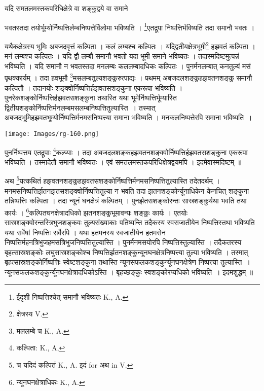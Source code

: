 \documentclass[11pt, openany]{book}
\begin{document}
{\ab यदि समतलमस्तकपरिधिक्षेत्रे वा शङ्कुद्वये वा समाने }

\newpage
\noindent भवतस्तदा तयोर्भूम्योर्निष्पत्तिर्लम्बनिष्पत्तेर्विलोमा भविष्यति । \renewcommand{\thefootnote}{१}\footnote{ईदृशी निष्पत्तिश्चेत् समानौ भविष्यतः {\en K., A.}}एतद्रूपा निष्पत्तिर्भविष्यति तदा समानौ भवतः ।\\
\vspace{5mm}

यथैकक्षेत्रस्य भूमिः अबजदवृत्तं कल्पिता । कलं लम्बश्च कल्पितः । यद्द्वितीयक्षेत्रभूमी\renewcommand{\thefootnote}{२}\footnote{क्षेत्रस्य {\en V.} } हझवतं कल्पिता । मनं लम्बश्च कल्पितः । यदि द्वौ लम्बौ समानौ भवतो यदा भूमी समाने भविष्यतः । तदास्मदिष्टमुत्पन्नं भविष्यति । यदि समानौ न भवतस्तदा मनलम्बः कललम्बादधिकः कल्पितः । पुनर्मनलम्बात् कनतुल्यं मसं पृथक्कार्यम् । तदा हवभूमौ \renewcommand{\thefootnote}{३}\footnote{मललम्बे च {\en K., A.}}मसलम्बतुल्यशङ्कुरुत्पाद्यः । प्रथमम् अबजदलशङ्कुहझवतनशङ्कु समानौ कल्पितौ । तदानयोः शङ्क्वोर्निष्पत्तिर्हझवतसशङ्कुना एकरूपा भविष्यति । पुनरेकशङ्कोर्निष्पत्तिर्हझवतसशङ्कुना तथास्ति यथा भूमेर्निष्पत्तिर्भूम्यास्ति द्वितीयशङ्कोर्निष्पत्तिर्मनलम्बमसलम्बनिष्पत्तितुल्यास्ति~। तस्मात्
अबजदभूमिहझवतभूम्योर्निष्पत्तिर्मनमसनिष्पत्त्या समाना भविष्यति । मनकलनिष्पत्तेरपि समाना भविष्यति~। 
\begin{center}
\texttt{[image: Images/rg-160.png]}  
\end{center}
\vspace{5mm}

 पुनर्निष्पत्तय एतद्रूपाः \renewcommand{\thefootnote}{४}\footnote{कल्पिता: {\en K., A,}}कल्प्याः । तदा अबजदलशङ्कहझवतनशङ्क्वोर्निष्पत्तिर्हझवतसशङ्कुना एकरूपा भविष्यति । तस्मादेतौ समानौ भविष्यतः । एवं समतलमस्तकपरिधिक्षेत्रद्वयमपि । इदमेवास्मदिष्टम् ॥ 

\newpage

अथ \renewcommand{\thefootnote}{१}\footnote{च यदिदं कल्पितं {\en K., A.} इदं {\en for} अथ {\en in V.}}यत्कथितं हझवतनशङ्कुहझवतसशङ्कोर्निष्पत्तिर्मनमसनिष्पत्तितुल्यास्ति तदेतदर्थम् ।
मनमसनिष्पत्तिर्झतनझतसशङ्क्वोर्निष्पत्तितुल्या न भवति तदा झतनशङ्कोर्न्यूनाधिकेन केनचित् शङ्कुना
तन्निष्पत्तिः कल्पिता । तदा न्यूनं घनक्षेत्रं कल्पितम् । पुनर्झतसशङ्कोरन्तः सास्रशङ्कुर्यथा भवति तथा कार्यः । \renewcommand{\thefootnote}{२}\footnote{न्यूनघनक्षेत्राधिकः {\en K., A.}}कल्पितघनक्षेत्रादधिको झतनशङ्कुभूमावन्यः शङ्कुः कार्यः । एतयोः
सास्रशङ्क्वोरन्तस्त्रिभुजशङ्कवः तुल्यसंख्याकाः पतिष्यन्ति तदैकस्य स्वसजातीयेन निष्पत्तिस्तथा भविष्यति यथा सर्वेषां निष्पत्तिः सर्वैरपि । यथा हतमनस्य स्वजातीयेन हतमसेन निष्पत्तिर्महनत्रिभुजहमसत्रिभुजनिष्पत्तितुल्यास्ति । पुनर्मनमसयोरपि निष्पत्तिस्तुल्यास्ति । तदैकतरस्य बृहत्सास्रशङ्कोः लघुसास्रशङ्कोश्च निष्पत्तिर्झतनशङ्कुन्यूनघनक्षेत्रनिष्पत्त्या
तुल्या भविष्यति । तस्मात् बृहत्सास्रशङ्कोर्निष्पत्तिः स्वेष्टशङ्कुना तथास्ति
न्यूनसफलकशङ्कुर्न्यूनघनक्षेत्रेण निष्पत्त्या तुल्यास्ति~। न्यूनसफलकशङ्कुर्न्यूनघनक्षेत्रादधिकोऽस्ति । बृहच्छङ्कुः स्वशङ्कोरप्यधिको भविष्यति~। इदमशुद्धम् ॥ \\
\vspace{5mm}
\end{document}
